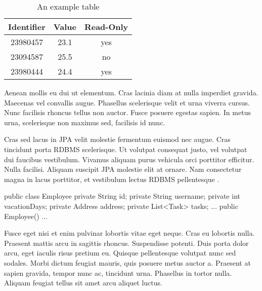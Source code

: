 \begin{table}
  \caption{An example table}
  \centering
  \label{tbl:example}
  \vspace{2mm}
  \begin{tabular}{ c c c }
    \hline
    Identifier & Value & Read-Only \\ 
    \hline
    23980457 & 23.1 & yes \\
    23094587 & 25.5 & no \\  
    23980444 & 24.4 & yes    
  \end{tabular}
\end{table}

Aenean mollis eu dui ut elementum. Cras lacinia diam at nulla imperdiet gravida. Maecenas vel convallis augue. Phasellus scelerisque velit et urna viverra cursus. Nunc facilisis rhoncus tellus non auctor. Fusce posuere egestas sapien. In metus urna, scelerisque non maximus sed, facilisis id nunc.

Cras sed lacus in \ac{JPA} velit molestie fermentum euismod nec augue. Cras tincidunt porta \ac{RDBMS} scelerisque. Ut volutpat consequat justo, vel volutpat dui faucibus vestibulum. Vivamus aliquam purus vehicula orci porttitor efficitur. Nulla facilisi. Aliquam suscipit \ac{JPA} molestie elit at ornare. Nam consectetur magna in lacus porttitor, et vestibulum lectus \ac{RDBMS} pellentesque \autocite{Bloch2018}.

\begin{javacode}[caption=Employee class with \acs{JPA} mapping annotations., label={lst:jpa-employee-entity}]
public class Employee {
    private String id;
    private String username;
    private int vacationDays;
    private Address address;
    private List<Task> tasks;
    ...
    public Employee() {}
    ...
}
\end{javacode}

Fusce eget nisi et enim pulvinar lobortis vitae eget neque. Cras eu lobortis nulla. Praesent mattis arcu in sagittis rhoncus. Suspendisse potenti. Duis porta dolor arcu, eget iaculis risus pretium eu. Quisque pellentesque volutpat nunc sed sodales. Morbi \textcite{Bloch2018} dictum feugiat mauris, quis posuere metus auctor a. Praesent at sapien gravida, tempor nunc ac, tincidunt urna. Phasellus in tortor nulla. Aliquam feugiat tellus sit amet arcu aliquet luctus. 
